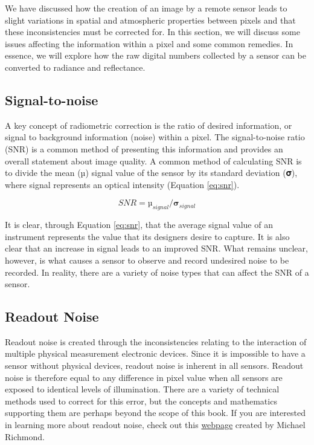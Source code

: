 \documentclass[
]{book}
\begin{document}
We have discussed how the creation of an image by a remote sensor leads to slight variations in spatial and atmospheric properties between pixels and that these inconsistencies must be corrected for. In this section, we will discuss some issues affecting the information within a pixel and some common remedies. In essence, we will explore how the raw digital numbers collected by a sensor can be converted to radiance and reflectance.

\hypertarget{signal-to-noise}{%
\subsection{Signal-to-noise}\label{signal-to-noise}}

A key concept of radiometric correction is the ratio of desired information, or signal to background information (noise) within a pixel. The signal-to-noise ratio (SNR) is a common method of presenting this information and provides an overall statement about image quality. A common method of calculating SNR is to divide the mean (µ) signal value of the sensor by its standard deviation (𝛔), where signal represents an optical intensity (Equation \eqref{eq:snr}).

\begin{equation}
SNR = µ _{signal} /𝛔 _{signal}
\label{eq:snr}
\end{equation}

It is clear, through Equation \eqref{eq:snr}, that the average signal value of an instrument represents the value that its designers desire to capture. It is also clear that an increase in signal leads to an improved SNR. What remains unclear, however, is what causes a sensor to observe and record undesired noise to be recorded. In reality, there are a variety of noise types that can affect the SNR of a sensor.

\hypertarget{readout-noise}{%
\subsection{Readout Noise}\label{readout-noise}}

Readout noise is created through the inconsistencies relating to the interaction of multiple physical measurement electronic devices. Since it is impossible to have a sensor without physical devices, readout noise is inherent in all sensors. Readout noise is therefore equal to any difference in pixel value when all sensors are exposed to identical levels of illumination. There are a variety of technical methods used to correct for this error, but the concepts and mathematics supporting them are perhaps beyond the scope of this book. If you are interested in learning more about readout noise, check out this \href{http://spiff.rit.edu/classes/phys445/lectures/readout/readout.html}{webpage} created by Michael Richmond.
\end{document}

